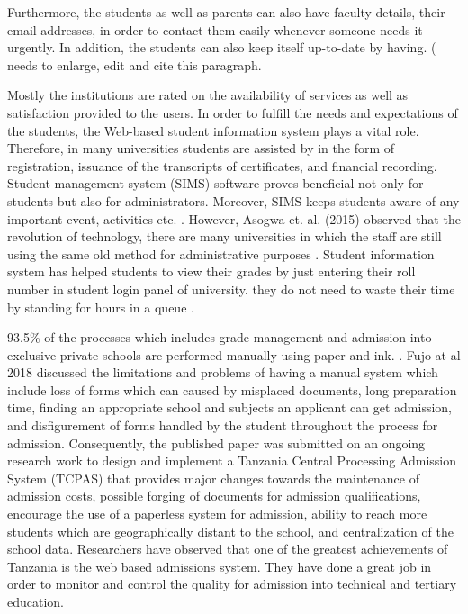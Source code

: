 \documentclass[11pt,a4paper,titlepage]{article}
\begin{document}
Furthermore, the students as well as parents can also have faculty details, their email addresses, in order to contact them easily whenever someone needs it urgently.
In addition, the students can also keep itself up-to-date by having.  ( needs to enlarge, edit and cite this paragraph.

Mostly the institutions are rated on the availability of services as well as satisfaction provided to the users. In order to fulfill the needs and expectations of the students, the Web-based student information system plays a vital role. Therefore, in many universities students are assisted by in the form of registration,  issuance of the transcripts of certificates, and financial recording. Student management system (SIMS) software proves beneficial not only for students but also for administrators. Moreover, SIMS keeps students aware of any important event, activities etc. \cite{Asogwa}. However, Asogwa et. al. (2015) observed that the revolution of technology, there are many universities in which the staff are still using the same old method for administrative purposes .
Student information system has helped students to view their grades by just entering their roll number in student login panel of university. they do not need to waste their time by standing for hours in a queue \cite{SIAS}.

93.5\% of the processes which includes grade management and admission into exclusive private schools are performed manually using paper and ink. \cite{Fujo}. Fujo at al 2018 discussed the limitations and problems of having a manual system which include loss of forms which can caused by misplaced documents, long preparation time, finding an appropriate school and subjects an applicant can get admission, and disfigurement of forms handled by the student throughout the process for admission. Consequently, the published paper was submitted on an ongoing research work to design and implement a Tanzania Central Processing Admission System (TCPAS) that provides major changes towards the maintenance of admission costs, possible forging of documents for admission qualifications, encourage the use of a paperless system for admission, ability to reach more students which are geographically distant to the school, and centralization of the school data. Researchers have observed that one of the greatest achievements of Tanzania is the web based admissions system. They have done a great job in order to monitor and control the quality for admission into technical and tertiary education.
\end{document}
